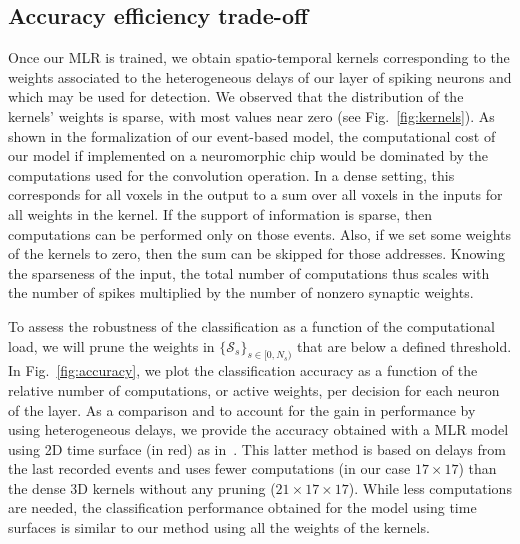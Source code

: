 \documentclass[default]{sn-jnl}%
\theoremstyle{thmstyleone}%
\theoremstyle{thmstyletwo}%
\theoremstyle{thmstylethree}%
\newcommand{\seeFig}[1]{see Fig.~\ref{fig:#1}}%
\newcommand{\synapse}{\mathcal{S}} %
\newcommand{\ranksyn}{s} %
\newcommand{\Nsyn}{N_{s}} %
\begin{document}
\subsection{Accuracy efficiency trade-off}%
Once our MLR is trained, we obtain spatio-temporal kernels corresponding to the weights associated to the heterogeneous delays of our layer of spiking neurons and which may be used for detection. We observed that the distribution of the kernels' weights is sparse, with most values near zero (\seeFig{kernels}). As shown in the formalization of our event-based model, the computational cost of our model if implemented on a neuromorphic chip would be dominated by the computations used for the convolution operation. In a dense setting, this corresponds for all voxels in the output to a sum over all voxels in the inputs for all weights in the kernel. If the support of information is sparse, then computations can be performed only on those events. Also, if we set some weights of the kernels to zero, then the sum can be skipped for those addresses. Knowing the sparseness of the input, the total number of computations thus scales with the number of spikes multiplied by the number of nonzero synaptic weights. %

To assess the robustness of the classification as a function of the computational load, we will prune the weights in $\{\synapse_\ranksyn\}_{\ranksyn \in [0,\Nsyn)}$ that are below a defined threshold. In Fig.~\ref{fig:accuracy}, we plot the classification accuracy as a function of the relative number of computations, or active weights, per decision for each neuron of the layer. As a comparison and to account for the gain in performance by using heterogeneous delays, we provide the accuracy obtained with a MLR model using 2D time surface (in red) as in~\citep{grimaldi_robust_2022}. This latter method is based on delays from the last recorded events and uses fewer computations (in our case $17\times17$) than the dense 3D kernels without any pruning ($21\times17\times17$). While less computations are needed, the classification performance obtained for the model using time surfaces is similar to our method using all the weights of the kernels.
\end{document}
